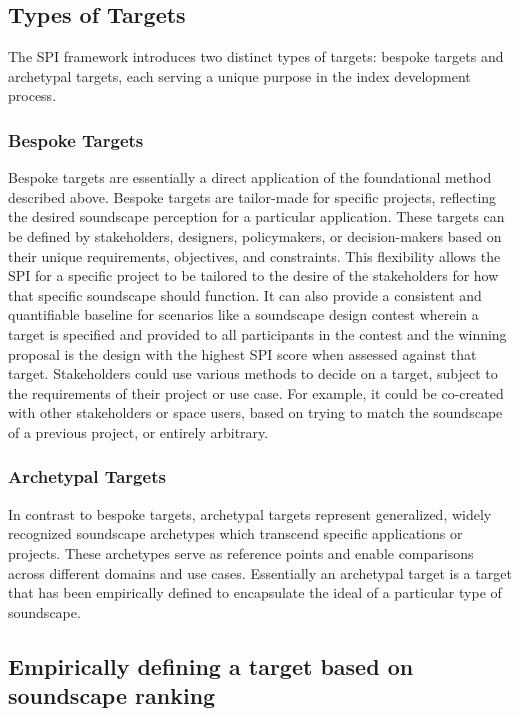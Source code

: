 \documentclass[
  authoryear,
  preprint,
  3p]{elsarticle}
\begin{document}
\subsection{Types of Targets}\label{sec-targets}

The SPI framework introduces two distinct types of targets: bespoke
targets and archetypal targets, each serving a unique purpose in the
index development process.

\subsubsection{Bespoke Targets}\label{bespoke-targets}

Bespoke targets are essentially a direct application of the foundational
method described above. Bespoke targets are tailor-made for specific
projects, reflecting the desired soundscape perception for a particular
application. These targets can be defined by stakeholders, designers,
policymakers, or decision-makers based on their unique requirements,
objectives, and constraints. This flexibility allows the SPI for a
specific project to be tailored to the desire of the stakeholders for
how that specific soundscape should function. It can also provide a
consistent and quantifiable baseline for scenarios like a soundscape
design contest wherein a target is specified and provided to all
participants in the contest and the winning proposal is the design with
the highest SPI score when assessed against that target. Stakeholders
could use various methods to decide on a target, subject to the
requirements of their project or use case. For example, it could be
co-created with other stakeholders or space users, based on trying to
match the soundscape of a previous project, or entirely arbitrary.

\subsubsection{Archetypal Targets}\label{archetypal-targets}

In contrast to bespoke targets, archetypal targets represent
generalized, widely recognized soundscape archetypes which transcend
specific applications or projects. These archetypes serve as reference
points and enable comparisons across different domains and use cases.
Essentially an archetypal target is a target that has been empirically
defined to encapsulate the ideal of a particular type of soundscape.

\subsection{Empirically defining a target based on soundscape
ranking}\label{empirically-defining-a-target-based-on-soundscape-ranking}
\end{document}
